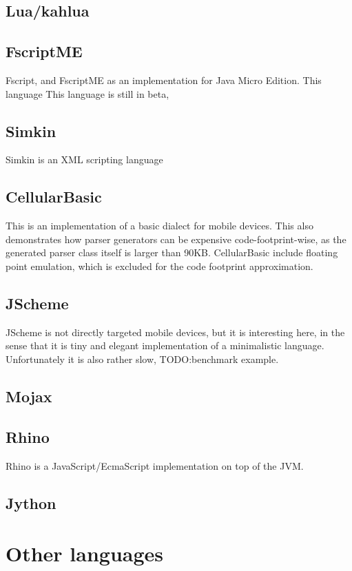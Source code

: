 \subsection{Lua/kahlua}
\subsection{FscriptME}
Fscript\cite{fscriptme}, and FscriptME as an implementation for Java Micro Edition.
This language
This language is still in beta, 

\subsection{Simkin}
Simkin is an XML scripting language

\subsection{CellularBasic}
This is an implementation of a basic dialect for mobile devices.
This also demonstrates how parser generators can be expensive code-footprint-wise, as the generated parser class itself is larger than 90KB.
CellularBasic include floating point emulation, which is excluded for the code footprint approximation.

\subsection{JScheme}
JScheme\cite{jscheme} is not directly targeted mobile devices, but it is interesting here, in the sense that it is tiny and elegant implementation of a minimalistic language.
Unfortunately it is also rather slow, TODO:benchmark example.

\subsection{Mojax}
\subsection{Rhino}
Rhino is a JavaScript/EcmaScript implementation on top of the JVM. 
\subsection{Jython}

\section{Other languages}
